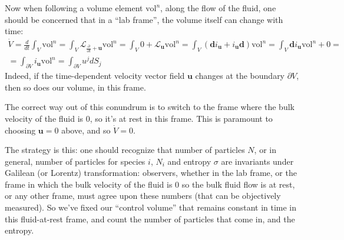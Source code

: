 \documentclass[10pt]{amsart}
\begin{document}
\begin{multicols*}{2}
\begin{enumerate}
Now when following a volume element $\text{vol}^n$, along the flow of the fluid, one should be concerned that in a ``lab frame'', the volume itself can change with time:
\[
\begin{gathered}
  \dot{V} = \frac{d}{dt} \int_V \text{vol}^n = \int_V \mathcal{L}_{ \frac{\partial }{ \partial t} + \mathbf{u} } \text{vol}^n = \int_V 0 + \mathcal{L}_{\mathbf{u}} \text{vol}^n = \int_V (\mathbf{d}i_{\mathbf{u}} + i_{\mathbf{u}} \mathbf{d} ) \text{vol}^n = \int_V\mathbf{d}i_{\mathbf{u}} \text{vol}^n + 0 = \\
  = \int_{\partial V} i_{\mathbf{u}} \text{vol}^n = \int_{ \partial V} u^j dS_j
\end{gathered}
\]
Indeed, if the time-dependent velocity vector field $\mathbf{u}$ changes at the boundary $\partial V$, then so does our volume, in this frame.  

The correct way out of this conundrum is to switch to the frame where the bulk velocity of the fluid is $0$, so it's at rest in this frame.  This is paramount to choosing $\mathbf{u}=0$ above, and so $\dot{V}=0$.  

The strategy is this: one should recognize that number of particles $N$, or in general, number of particles for species $i$, $N_i$ and entropy $\sigma$ are invariants under Galilean (or Lorentz) transformation: observers, whether in the lab frame, or the frame in which the bulk velocity of the fluid is $0$ so the bulk fluid flow is at rest, or any other frame, must agree upon these numbers (that can be objectively measured).  So we've fixed our ``control volume'' that remains constant in time in this fluid-at-rest frame, and count the number of particles that come in, and the entropy.  


\end{enumerate}
\end{multicols*}
\end{document}
